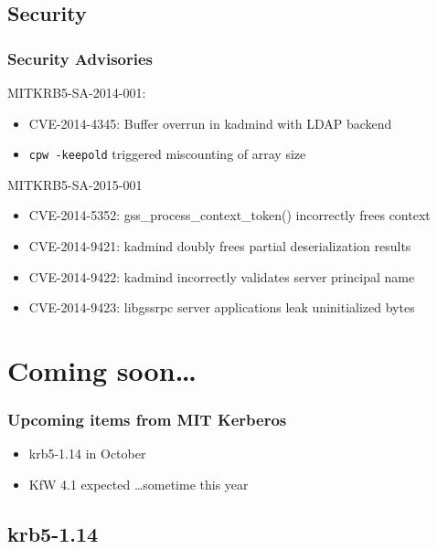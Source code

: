 \documentclass{beamer}
\begin{document}
\subsection{Security}

\begin{frame}[fragile]
\frametitle{Security Advisories}
MITKRB5-SA-2014-001:
\begin{itemize}
\item{CVE-2014-4345: Buffer overrun in kadmind with LDAP backend}
\item{\verb+cpw -keepold+ triggered miscounting of array size}
\end{itemize}
MITKRB5-SA-2015-001
\begin{itemize}
\item{CVE-2014-5352: gss\_process\_context\_token() incorrectly frees context}
\item{CVE-2014-9421: kadmind doubly frees partial deserialization results}
\item{CVE-2014-9422: kadmind incorrectly validates server principal name}
\item{CVE-2014-9423: libgssrpc server applications leak uninitialized bytes}
\end{itemize}
\end{frame}

\section{Coming soon\ldots{}}

\begin{frame}
\frametitle{Upcoming items from MIT Kerberos}
\begin{itemize}
\item{krb5-1.14 in October}
\item{KfW 4.1 expected \ldots sometime this year}
\end{itemize}
\end{frame}

\subsection{krb5-1.14}
\end{document}
